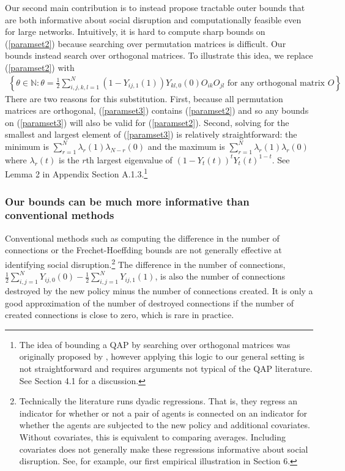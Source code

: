 \documentclass[12pt]{article}
\theoremstyle{definition}
\begin{document}
Our second main contribution is to instead propose tractable outer bounds that are both informative about social disruption and computationally feasible even for large networks. Intuitively, it is hard to compute sharp bounds on  (\ref{paramset2}) because searching over permutation matrices is difficult. Our bounds instead search over orthogonal matrices. To illustrate this idea, we replace (\ref{paramset2}) with 
 \begin{align}\label{paramset3}
 \left\{\theta \in \mathbb{N}: \theta = \frac{1}{2}\sum_{i,j,k,l = 1}^{N}(1-Y_{ij,1}(1))Y_{kl,0}(0)O_{ik}O_{jl} \text{ for any orthogonal matrix } O \right\}.
 \end{align}
There are two reasons for this substitution. First, because all permutation matrices are orthogonal, (\ref{paramset3}) contains (\ref{paramset2}) and so any bounds on (\ref{paramset3})  will also be valid for (\ref{paramset2}). Second, solving for the smallest and largest element of (\ref{paramset3})  is relatively straightforward: the minimum is $\sum_{r=1}^{N}\lambda_{r}(1)\lambda_{N-r}(0)$ and the maximum is  $\sum_{r=1}^{N}\lambda_{r}(1)\lambda_{r}(0)$ where $\lambda_{r}(t)$ is the $r$th largest eigenvalue of $(1-Y_{t}(t))^{t}Y_{t}(t)^{1-t}$. See Lemma 2 in Appendix Section A.1.3.\footnote{The idea of bounding a QAP by searching over orthogonal matrices was originally proposed by \cite{finke1987quadratic}, however applying this logic to our general setting is not straightforward and requires arguments not typical of the QAP literature. See Section 4.1 for a discussion. }   


\subsubsection{Our bounds can be much more informative than conventional methods}
Conventional methods such as computing the difference in the number of connections or the Frechet-Hoeffding bounds are not generally effective at identifying social disruption.\footnote{Technically the literature runs dyadic regressions. That is, they regress an indicator for whether or not a pair of agents is connected on an indicator for whether the agents are subjected to the new policy and additional covariates. Without covariates, this is equivalent to comparing averages. Including covariates does not generally make these regressions informative about social disruption. See, for example, our first empirical illustration in Section 6.} The difference in the number of connections, $\frac{1}{2}\sum_{i,j = 1}^{N}Y_{ij,0}(0) - \frac{1}{2}\sum_{i,j = 1}^{N}Y_{ij,1}(1)$, is also the number of connections destroyed by the new policy minus the number of connections created. It is only a good approximation of the number of destroyed connections if the number of created connections is close to zero, which is rare in practice.   
\end{document}
